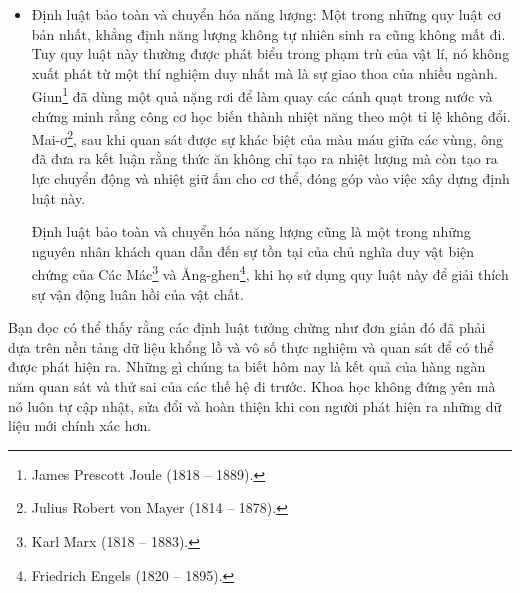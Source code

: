 \begin{itemize}
    \item \textcolor{colorEmphasisGreen}{Định luật bảo toàn và chuyển hóa năng lượng}: Một trong những quy luật cơ bản nhất, khẳng định năng lượng không tự nhiên sinh ra cũng không mất đi. Tuy quy luật này thường được phát biểu trong phạm trù của vật lí, nó không xuất phát từ một thí nghiệm duy nhất mà là sự giao thoa của nhiều ngành. Giun\footnote{James Prescott Joule (1818 -- 1889).} đã dùng một quả nặng rơi để làm quay các cánh quạt trong nước và chứng minh rằng công cơ học biến thành nhiệt năng theo một tỉ lệ không đổi. Mai-ơ\footnote{Julius Robert von Mayer (1814 -- 1878).}, sau khi quan sát được sự khác biệt của màu máu giữa các vùng, ông đã đưa ra kết luận rằng thức ăn không chỉ tạo ra nhiệt lượng mà còn tạo ra lực chuyển động và nhiệt giữ ấm cho cơ thể, đóng góp vào việc xây dựng định luật này.

          Định luật bảo toàn và chuyển hóa năng lượng cũng là một trong những nguyên nhân khách quan dẫn đến sự tồn tại của chủ nghĩa duy vật biện chứng của Các Mác\footnote{Karl Marx (1818 -- 1883).} và Ăng-ghen\footnote{Friedrich Engels (1820 -- 1895).}, khi họ sử dụng quy luật này để giải thích sự vận động luân hồi của vật chất.
\end{itemize}

Bạn đọc có thể thấy rằng các định luật tưởng chừng như đơn giản đó đã phải dựa trên nền tảng dữ liệu khổng lồ và vô số thực nghiệm và quan sát để có thể được phát hiện ra. Những gì chúng ta biết hôm nay là kết quả của hàng ngàn năm quan sát và thử sai của các thế hệ đi trước. Khoa học không đứng yên mà nó luôn tự cập nhật, sửa đổi và hoàn thiện khi con người phát hiện ra những dữ liệu mới chính xác hơn.
